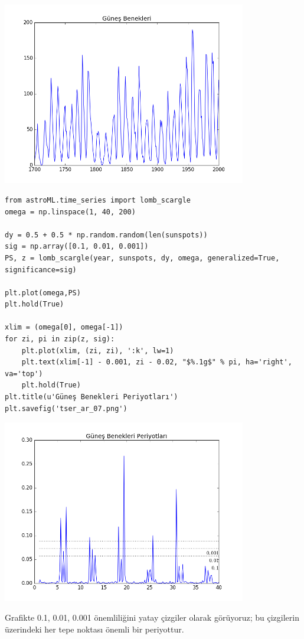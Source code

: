 \documentclass[12pt,fleqn]{article}\usepackage{../../common}
\begin{document}
\includegraphics[height=8cm]{tser_ar_06.png}

\begin{verbatim}
from astroML.time_series import lomb_scargle
omega = np.linspace(1, 40, 200)

dy = 0.5 + 0.5 * np.random.random(len(sunspots))
sig = np.array([0.1, 0.01, 0.001])
PS, z = lomb_scargle(year, sunspots, dy, omega, generalized=True, significance=sig)

plt.plot(omega,PS)
plt.hold(True)

xlim = (omega[0], omega[-1])
for zi, pi in zip(z, sig):
    plt.plot(xlim, (zi, zi), ':k', lw=1)
    plt.text(xlim[-1] - 0.001, zi - 0.02, "$%.1g$" % pi, ha='right', va='top')
    plt.hold(True)
plt.title(u'Güneş Benekleri Periyotları')
plt.savefig('tser_ar_07.png')
\end{verbatim}

\includegraphics[height=8cm]{tser_ar_07.png}

Grafikte 0.1, 0.01, 0.001 önemliliğini yatay çizgiler olarak görüyoruz; bu
çizgilerin üzerindeki her tepe noktası önemli bir periyottur.
\end{document}
